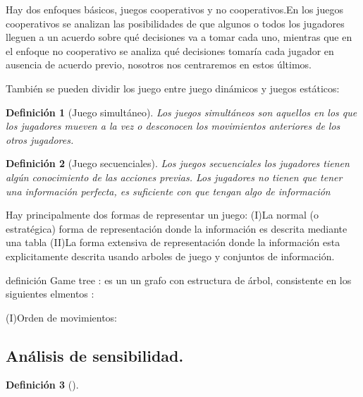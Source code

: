 \documentclass[16pt, a4paper]{article} %
\newtheorem{definicion}{Definición}[section]
\begin{document}
Hay dos enfoques básicos, juegos cooperativos y no cooperativos.En los juegos cooperativos se analizan las posibilidades de que algunos o todos los jugadores lleguen a un acuerdo sobre qué decisiones va a tomar cada uno, mientras que en el enfoque no cooperativo se analiza qué decisiones tomaría cada jugador en ausencia de acuerdo previo, nosotros nos centraremos en estos últimos.

También se pueden dividir los juego entre juego dinámicos y juegos estáticos:



\begin{definicion}[Juego simultáneo]
Los juegos simultáneos son aquellos en los que los jugadores 
mueven a la vez o desconocen los movimientos anteriores de los 
otros jugadores. 
\end{definicion}


\begin{definicion}[Juego secuenciales]
Los juegos secuenciales los jugadores tienen algún 
conocimiento de las acciones previas. Los jugadores no tienen que 
tener una información perfecta, es suficiente con que tengan algo 
de información
\end{definicion}





Hay principalmente dos formas de representar un juego:
(I)La normal (o estratégica) forma de representación donde la información es descrita mediante una tabla
(II)La forma extensiva de representación donde la información esta explicitamente descrita usando arboles de juego y conjuntos de información.

definición Game tree :
es un un grafo con estructura de árbol, consistente en los siguientes elmentos :

(I)Orden de movimientos:




\subsection{Análisis de sensibilidad.}
\begin{definicion}[]

\end{definicion}






\newpage

\end{document}
